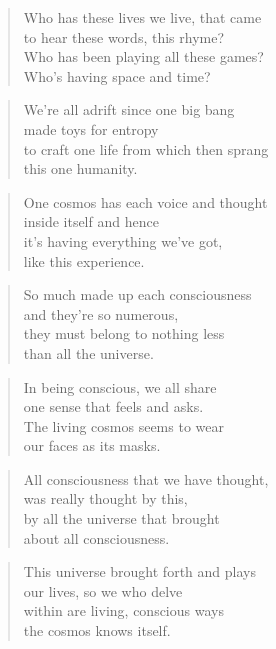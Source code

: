 \documentclass[10pt,a4paper]{article}
\begin{document}
\begin{paracol}{2}
\begin{verse}
Who has these lives we live, that came\\
to hear these words, this rhyme?\\
Who has been playing all these games?\\
Who’s having space and time?
\end{verse}

\begin{verse}
We’re all adrift since one big bang\\
made toys for entropy\\
to craft one life from which then sprang\\
this one humanity.
\end{verse}

\begin{verse}
One cosmos has each voice and thought\\
inside itself and hence\\
it’s having everything we’ve got,\\
like this experience.
\end{verse}

\begin{verse}
So much made up each consciousness\\
and they’re so numerous,\\
they must belong to nothing less\\
than all the universe.
\end{verse}

\begin{verse}
In being conscious, we all share\\
one sense that feels and asks.\\
The living cosmos seems to wear\\
our faces as its masks.
\end{verse}

\begin{verse}
All consciousness that we have thought,\\
was really thought by this,\\
by all the universe that brought\\
about all consciousness.
\end{verse}

\begin{verse}
This universe brought forth and plays\\
our lives, so we who delve\\
within are living, conscious ways\\
the cosmos knows itself.
\end{verse}


\end{paracol}
\end{document}
